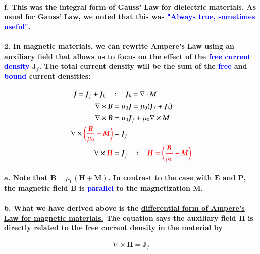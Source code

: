 \documentclass{article}
\begin{document}
\paragraph{\indent f. This was the integral form of Gauss' Law for dielectric materials. As usual for Gauss' Law, we noted that this was \textcolor{blue}{"Always true, sometimes useful"}.}
\paragraph{2. In magnetic materials, we can rewrite Ampere's Law using an auxiliary field that allows us to focus on the effect of the \textcolor{blue}{free current density} $\boldsymbol{J}_f$. The total current density will be the sum of the \textcolor{blue}{free} and \textcolor{blue}{bound} current densities:}
\begin{align*}
    \boldsymbol{J}=\boldsymbol{J}_f+\boldsymbol{J}_b\quad&:\quad \boldsymbol{J}_b=\nabla\cdot\boldsymbol{M}\\
    \nabla\times\boldsymbol{B}&=\mu_0\boldsymbol{J}=\mu_0(\boldsymbol{J}_f+\boldsymbol{J}_b)\\
    \nabla\times\boldsymbol{B}&=\mu_0\boldsymbol{J}_f+\mu_0\nabla\times\boldsymbol{M}\\
    \nabla \times\textcolor{red}{\bigg(\frac{\boldsymbol{B}}{\mu_0}-\boldsymbol{M}\bigg)}&=\boldsymbol{J}_f\\
    \nabla\times\textcolor{red}{\boldsymbol{H}}&=\boldsymbol{J}_f\quad:\quad\textcolor{red}{\boldsymbol{H}=\bigg(\frac{\boldsymbol{B}}{\mu_0}-\boldsymbol{M}\bigg)}
\end{align*}
\paragraph{\indent a. Note that $\boldsymbol{B}=\mu_0(\boldsymbol{H}+\boldsymbol{M})$. In contrast to the case with $\boldsymbol{E}$ and $\boldsymbol{P}$, the magnetic field $\boldsymbol{B}$ is \textcolor{blue}{parallel} to the magnetization $\boldsymbol{M}$.}
\paragraph{\indent b. What we have derived above is the \underline{differential form of Ampere's Law for magnetic materials.} The equation says the auxiliary field $\boldsymbol{H}$ is directly related to the free current density in the material by}
\begin{equation*}
    \nabla \times\boldsymbol{H}=\boldsymbol{J}_f
\end{equation*}
\end{document}
